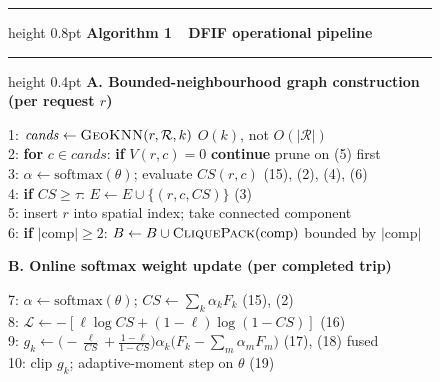 \documentclass[conference]{IEEEtran}
\begin{document}
\begin{figure}[t]
\footnotesize
\hrule height 0.8pt \vspace{2pt}
\noindent\textbf{Algorithm 1\ \ DFIF operational pipeline}
\vspace{2pt}\hrule height 0.4pt \vspace{3pt}
\noindent\textbf{A. Bounded-neighbourhood graph construction (per request $r$)}

\vspace{1pt}\noindent
\hspace*{0.6em}1: $\mathit{cands}\leftarrow\textsc{GeoKNN}(r,\mathcal{R},k)$
 \hfill $O(k)$, not $O(|\mathcal{R}|)$\\
\hspace*{0.6em}2: \textbf{for} $c\in\mathit{cands}$: \textbf{if} $V(r,c)=0$
 \textbf{continue} \hfill prune on (5) first\\
\hspace*{0.6em}3: \hspace*{0.8em}$\alpha\leftarrow\mathrm{softmax}(\theta)$;
 evaluate $CS(r,c)$ \hfill (15), (2), (4), (6)\\
\hspace*{0.6em}4: \hspace*{0.8em}\textbf{if} $CS\ge\tau$:
 $E\leftarrow E\cup\{(r,c,CS)\}$ \hfill (3)\\
\hspace*{0.6em}5: insert $r$ into spatial index; take connected component\\
\hspace*{0.6em}6: \textbf{if} $|\mathrm{comp}|\ge2$:
 $B\leftarrow B\cup\textsc{CliquePack}(\mathrm{comp})$
 \hfill bounded by $|\mathrm{comp}|$

\vspace{3pt}\noindent\textbf{B. Online softmax weight update (per completed trip)}

\vspace{1pt}\noindent
\hspace*{0.6em}7: $\alpha\leftarrow\mathrm{softmax}(\theta)$;
 $CS\leftarrow\sum_k\alpha_k F_k$ \hfill (15), (2)\\
\hspace*{0.6em}8: $\mathcal{L}\leftarrow
 -[\ell\log CS+(1-\ell)\log(1-CS)]$ \hfill (16)\\
\hspace*{0.6em}9: $g_k\leftarrow
 \bigl(-\tfrac{\ell}{CS}+\tfrac{1-\ell}{1-CS}\bigr)
 \alpha_k\bigl(F_k-\sum_m\alpha_m F_m\bigr)$ \hfill (17), (18) fused\\
\hspace*{0.4em}10: clip $g_k$; adaptive-moment step on $\theta$ \hfill (19)


\end{figure}
\end{document}
